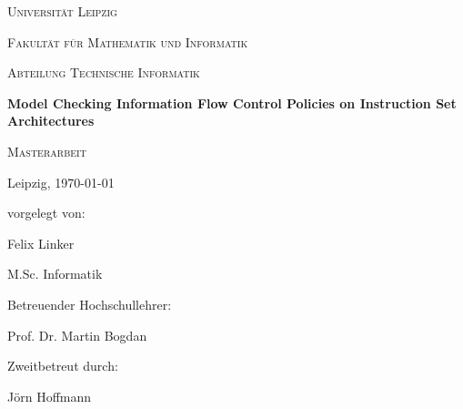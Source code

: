 \documentclass{securem}
\begin{document}
\begin{titlepage}
    \centering
    \par
    \vspace{1cm}
    {\scshape\LARGE Universität Leipzig} \par
    \vspace{0.3cm}
    {\scshape\Large Fakultät für Mathematik und Informatik} \par
    {\scshape\Large Abteilung Technische Informatik} \par
    \vspace{2.3cm}
    {\huge\bfseries Model Checking Information Flow Control Policies on Instruction Set Architectures} \par
    \vspace{1.5cm}
    {\scshape\Large Masterarbeit} \par
    \vspace{0.3cm}
    {\large Leipzig, \today} \par
    \vspace {1.5cm}
    {
        vorgelegt von: \par
        Felix Linker \par
        M.Sc. Informatik
    }
    \vfill
    \begin{multicols}{2}
        Betreuender Hochschullehrer: \par
        Prof. Dr. Martin Bogdan \par
        \columnbreak
        Zweitbetreut durch: \par
        Jörn Hoffmann
    \end{multicols}
\end{titlepage}

\newpage

\tableofcontents
\thispagestyle{empty}

\newpage

\setcounter{page}{1}










\printbibliography
\end{document}
